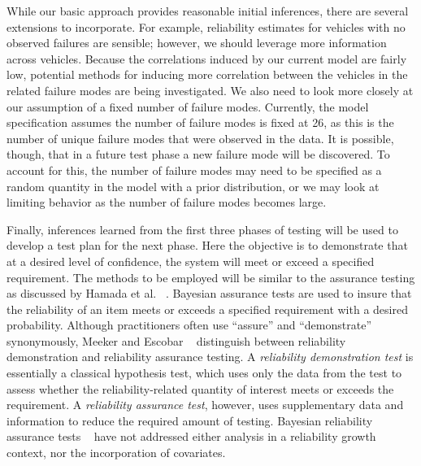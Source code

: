 \documentclass[12pt]{article}
\begin{document}
While our basic approach provides reasonable initial inferences, there are several extensions to incorporate. For example, reliability estimates for vehicles with no observed failures are sensible; however, we should leverage more information across vehicles. Because the correlations induced by our current model are fairly low, potential methods for inducing more correlation between the vehicles in the related failure modes are being investigated. We also need to look more closely at our assumption of a fixed number of failure modes. Currently, the model specification assumes the number of failure modes is fixed at 26, as this is the number of unique failure modes that were observed in the data. It is possible, though, that in a future test phase a new failure mode will be discovered. To account for this, the number of failure modes may need to be specified as a random quantity in the model with a prior distribution, or we may look at limiting behavior as the number of failure modes becomes large.

Finally, inferences learned from the first three phases of testing will be used to develop a test plan for the next phase. Here the objective is to demonstrate that at a desired level of confidence, the system will meet or exceed a specified requirement. The methods to be employed will be similar to the assurance testing as discussed by Hamada et al. ~\cite{ref2}. Bayesian assurance tests are used to insure that the reliability of an item meets or exceeds a specified requirement with a desired probability. Although practitioners often use ``assure'' and ``demonstrate'' synonymously, Meeker and Escobar ~\cite{ME04} distinguish between reliability demonstration and reliability assurance testing. A \emph{reliability demonstration test} is essentially a classical hypothesis test, which uses only the data from the test to assess whether the reliability-related quantity of interest meets or exceeds the requirement. A \emph{reliability assurance test}, however, uses supplementary data and information to reduce the required amount of testing. Bayesian reliability assurance tests ~\cite{HWWGM13,JGHR03,HMRGJW04,EH06} have not addressed either analysis in a reliability growth context, nor the incorporation of covariates.
\end{document}
